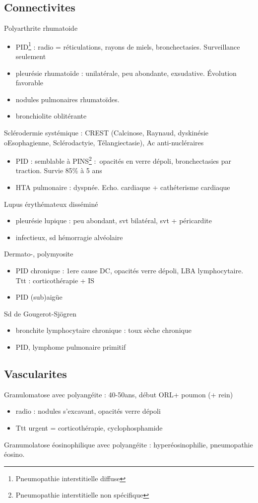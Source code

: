 \documentclass{article}
\begin{document}
\subsection{Connectivites}
Polyarthrite rhumatoide
\begin{itemize}
\item PID\footnote{Pneumopathie interstitielle diffuse} : radio =
  réticulations, rayons de miels, bronchectasies. Surveillance seulement
\item pleurésie rhumatoïde : unilatérale, peu abondante, exsudative. Évolution
  favorable
\item nodules pulmonaires rhumatoïdes. 
\item bronchiolite oblitérante
\end{itemize}
Sclérodermie systémique : CREST (Calcinose, Raynaud, dyskinésie oEsophagienne,
Sclérodactyie, Télangiectasie), Ac anti-nucléraires
\begin{itemize}
\item PID : semblable à PINS\footnote{Pneumopathie interstitielle non
    spécifique} : opacités en verre dépoli, bronchectasies par traction. Survie
  85\% à 5 ans
\item HTA pulmonaire : dyspnée. Echo. cardiaque +
  cathéterisme cardiaque
\end{itemize}
Lupus érythémateux disséminé 
\begin{itemize}
\item pleurésie lupique : peu abondant, svt bilatéral, svt + péricardite
\item infectieux, sd hémorragie alvéolaire
\end{itemize}
Dermato-, polymyosite
\begin{itemize}
\item PID chronique : 1ere cause DC, opacités verre dépoli, \gls{LBA} lymphocytaire.
  Ttt : corticothérapie + IS
\item PID (sub)aigüe
\end{itemize}
Sd de Gougerot-Sjögren
\begin{itemize}
\item bronchite lymphocytaire chronique : toux sèche chronique
\item PID, lymphome pulmonaire primitif
\end{itemize}

\subsection{Vascularites}
Granulomatose avec polyangéite : 40-50ans, début ORL+ poumon (+ rein)
\begin{itemize}
\item radio : nodules s'excavant, opacités verre dépoli
\item Ttt urgent = corticothérapie, cyclophosphamide
\end{itemize}
Granumolatose éosinophilique avec polyangéite :  hyperéosinophilie, pneumopathie
éosino.
\end{document}
